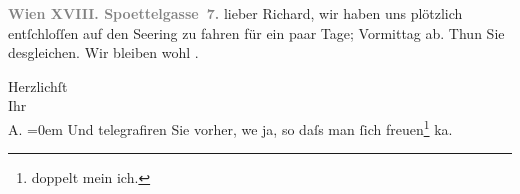 \pstart
           \textcolor{gray}{\textbf{Wien XVIII. Spoettelgasse 7.}}\pend
           \vspace{0.5em}
\pstart
           lieber Richard, wir haben uns plötzlich entſchloſſen auf den Se{\geminationm}ering zu fahren
               für ein paar Tage; \label{K_L01797-1v}\label{K_L01797-1}{ }Vormittag ab. Thun {\pb}Sie desgleichen.
               Wir bleiben wohl \label{K_L01797-2v}\label{K_L01797-2}.\pend
           
\pstart
           Herzlichſt{\\[\baselineskip]}Ihr{\\[\baselineskip]}\spacefill\mbox{A.}\pend
           \leftskip=0em{}
\pstart
           \noindent{}Und telegrafiren Sie vorher, we{\geminationn} ja, so daſs man{ }ſich
                     freuen\footnote{\noindent{}doppelt mein ich.} ka{\geminationn}.\pend
           \endnumbering{}  \newcommand{\dateiname}{L01797}\newcommand{\titel}{Arthur Schnitzler an Richard Beer-Hofmann, 5. 11. 1908}\newcommand{\editorInnen}{Martin Anton Müller und Gerd-Hermann Susen}
